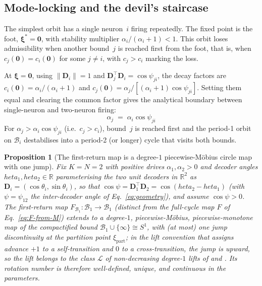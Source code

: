 \documentclass[12pt]{article}
\newcommand{\vv}[1]{\mathbf{#1}}
\newcommand{\DD}{\vv{D}}
\newcommand{\xxi}{\boldsymbol{\xi}}
\newcommand{\RR}{\mathbb{R}}
\newcommand{\Bsp}{\mathcal{B}}
\newtheorem{proposition}{Proposition}
\begin{document}
\subsection{Mode-locking and the devil's staircase}


The simplest orbit has a single neuron~$i$ firing repeatedly. The fixed point is the foot, $\xxi^*=\vv{0}$, with stability multiplier $\alpha_i/(\alpha_i+1)<1$. This orbit loses admissibility when another bound~$j$ is reached first from the foot, that is, when $c_j(\vv{0})=c_i(\vv{0})$ for some $j\neq i$, with $c_j>c_i$ marking the loss.

At $\xxi=\vv{0}$, using $\|\DD_i\|=1$ and $\DD_j^\top\DD_i=\cos\psi_{ji}$, the decay factors are $c_i(\vv{0})=\alpha_i/(\alpha_i+1)$ and $c_j(\vv{0})=\alpha_j/[(\alpha_i+1)\cos\psi_{ji}]$. Setting them equal and clearing the common factor gives the analytical boundary between single-neuron and two-neuron firing:
\begin{equation}\label{eq:bif12}
    \alpha_j \;=\; \alpha_i\cos\psi_{ji}
\end{equation}
For $\alpha_j>\alpha_i\cos\psi_{ji}$ (i.e.\ $c_j>c_i$), bound~$j$ is reached first and the period-1 orbit on $\Bsp_i$ destabilises into a period-2 (or longer) cycle that visits both bounds.



\begin{proposition}[The first-return map is a degree-$1$ piecewise-M\"obius circle map with one jump]\label{prop:circle-homeo}
Fix $K=N=2$ with positive drives $\alpha_1,\alpha_2>0$ and decoder angles $	heta_1,	heta_2\in\RR$ parameterising the two unit decoders in $\RR^2$ as $\DD_i=(\cos\theta_i,\sin\theta_i)$, so that $\cos\psi=\DD_1^\top\DD_2=\cos(	heta_2-	heta_1)$ (with $\psi=\psi_{12}$ the inter-decoder angle of Eq.~\eqref{eq:geometry}), and assume $\cos\psi>0$. The first-return map $F_{\!\Bsp_1}:\Bsp_1\to\Bsp_1$ (distinct from the full-cycle map $F$ of Eq.~\eqref{eq:F-from-M}) extends to a degree-$1$, piecewise-M\"obius, piecewise-monotone map of the compactified bound $\Bsp_1\cup\{\infty\}\cong S^1$, with (at most) one jump discontinuity at the partition point $\xi_{\mathrm{part}}$; in the lift convention that assigns advance $+1$ to a self-transition and $0$ to a cross-transition, the jump is upward, so the lift belongs to the class $\mathcal{L}$ of non-decreasing degree-$1$ lifts of \citet{rhodes1991topologies} and \citet[Ch.~3]{alseda2000combinatorial}. Its rotation number is therefore well-defined, unique, and continuous in the parameters.
\end{proposition}
\end{document}
